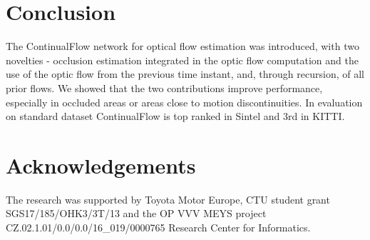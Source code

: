 \documentclass[runningheads]{llncs}
\begin{document}
 


\section{Conclusion}
The ContinualFlow network for optical flow estimation was introduced, with two novelties - occlusion estimation integrated in the optic flow computation  and the use of the optic flow from the previous time instant, and, through recursion, of all prior flows.
We showed that the two contributions improve performance, especially in occluded areas or areas close to motion discontinuities. 
In evaluation on standard dataset ContinualFlow is top ranked in Sintel and 3rd in KITTI.


\section*{Acknowledgements}
The research was supported by Toyota Motor Europe, CTU student grant \\
SGS17/185/OHK3/3T/13 and the OP VVV MEYS project\\
CZ.02.1.01/0.0/0.0/16\_019/0000765 Research Center for Informatics.
 




\end{document}
